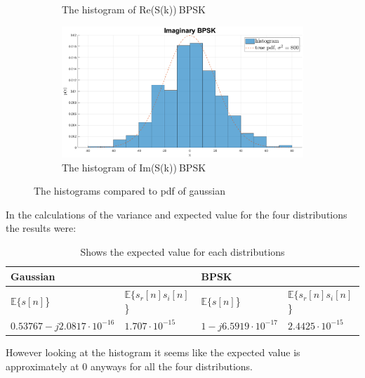 \begin{figure}[ht]
\begin{subfigure}{.5\textwidth}
        \caption{The histogram of Re(S(k))$~$BPSK}
        \label{fig:re_bpsk}
    \end{subfigure}
    \begin{subfigure}{.5\textwidth}
        \centering
        \includegraphics[width=.8\linewidth]{figures/im_bpsk.eps}
        \caption{The histogram of Im(S(k))$~$BPSK}
        \label{fig:im_bpsk}
    \end{subfigure}
    \caption{The histograms compared to pdf of gaussian}
    \label{fig:gauss}
\end{figure}
In the calculations of the variance and expected value for the four distributions the results were:
\begin{table}[ht]
\centering
\begin{tabular}{|l|l|l|l|}
\hline
\multicolumn{2}{|l|}{Gaussian} & \multicolumn{2}{|l|}{BPSK}\\ \hline
$\mathbb{E}\{s[n]$\} & $\mathbb{E}\{s_{r}[n]s_{i}[n]$\} & $\mathbb{E}\{s[n]$\} & $\mathbb{E}\{s_{r}[n]s_{i}[n]$\}\\
\hline
$0.53767-j2.0817\cdot10^{-16}$ & $1.707\cdot10^{-15}$ & $1-j6.5919\cdot10^{-17}$ & $2.4425\cdot10^{-15}$\\ 
\hline
\end{tabular}
\caption{Shows the expected value for each distributions}
\end{table}
However looking at the histogram it seems like the expected value is approximately at $0$ anyways for all the four distributions.

